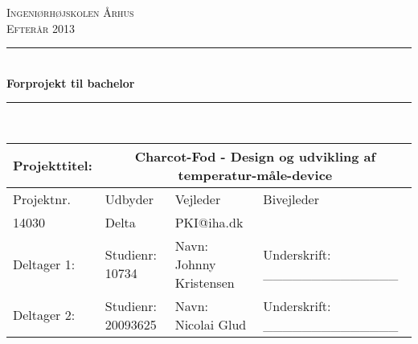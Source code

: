 \newcommand{\HRule}{\rule{\linewidth}{0.5mm}} %

\begin{center} %
 

\textsc{\LARGE Ingeniørhøjskolen Århus}\\[1.5cm] %
\textsc{\large Efterår 2013}\\[0.5cm] %


\HRule \\[0.4cm]
{ \huge \bfseries Forprojekt til bachelor}\\[0.4cm] %
\HRule \\[1.5cm]
 

\begin{table}[H]
    \begin{tabular}{|l|l|l|p{4cm}|}
    \hline
    Projekttitel: & \multicolumn{3}{|c|}{Charcot-Fod - Design og udvikling af temperatur-måle-device}                               \\ \hline
    Projektnr.   & Udbyder                                                     & Vejleder                & Bivejleder                     \\ \hline
    14030        & Delta                                                       & PKI@iha.dk              & ~                              \\ \hline
    Deltager 1:  & Studienr: 10734                                             & Navn: Johnny Kristensen & Underskrift: \_\_\_\_\_\_\_\_\_\_\_\_\_\_ \\ \hline
    Deltager 2:  & Studienr: 20093625                                          & Navn: Nicolai Glud      & Underskrift: \_\_\_\_\_\_\_\_\_\_\_\_\_\_ \\ \hline
    \end{tabular}


\end{table}
\end{center}
